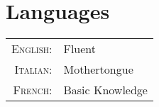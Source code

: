 \documentclass[a4paper,12pt]{article} %
\begin{document}
\begin{tabular}{rl}



\end{tabular}


\begin{comment}
\section{Scholarships and Certificates}

\begin{tabular}{rl}
\textsc{Sept.} 2012 & Faculty of Science Masters Scholarship \footnotesize(\$30,000)\normalsize\\

\textsc{June} 2010 & {\textsc{Gmat}\textregistered}\setmainfont[SmallCapsFont=Fontin SmallCaps]{Fontin-Regular}: 730 (\textsc{q:50;v:39}) 96\textsuperscript{th} percentile; \textsc{awa}: 6.0/6.0 (89\textsuperscript{th} percentile)
\end{tabular}
\end{comment}


\section{Languages}

\begin{tabular}{rl}
\textsc{English:} & Fluent\\

\textsc{Italian:} & Mothertongue\\

\textsc{French:} & Basic Knowledge\\
\end{tabular}
\end{document}
